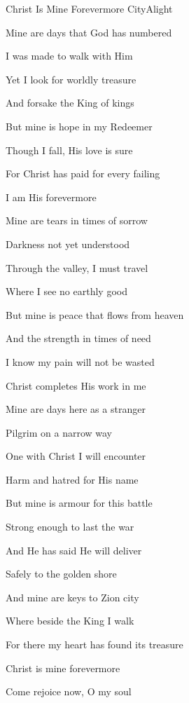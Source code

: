\documentclass[12pt]{book}
\begin{document}
\begin{song}{Christ Is Mine Forevermore}{}
  { CityAlight}
  {}
  {}
  {}
  \begin{SBVerse}
    Mine are days that God has numbered

    I was made to walk with Him

    Yet I look for worldly treasure

    And forsake the King of kings

    But mine is hope in my Redeemer

    Though I fall, His love is sure

    For Christ has paid for every failing

    I am His forevermore
  \end{SBVerse}
  \begin{SBVerse}
    Mine are tears in times of sorrow

    Darkness not yet understood

    Through the valley, I must travel

    Where I see no earthly good

    But mine is peace that flows from heaven

    And the strength in times of need

    I know my pain will not be wasted

    Christ completes His work in me
  \end{SBVerse}
  \begin{SBVerse}
    Mine are days here as a stranger

    Pilgrim on a narrow way

    One with Christ I will encounter

    Harm and hatred for His name

    But mine is armour for this battle

    Strong enough to last the war

    And He has said He will deliver

    Safely to the golden shore

    And mine are keys to Zion city

    Where beside the King I walk

    For there my heart has found its treasure

    Christ is mine forevermore
  \end{SBVerse}

  \begin{SBVerse}
    Come rejoice now, O my soul


\end{SBVerse}
\end{song}
\end{document}
